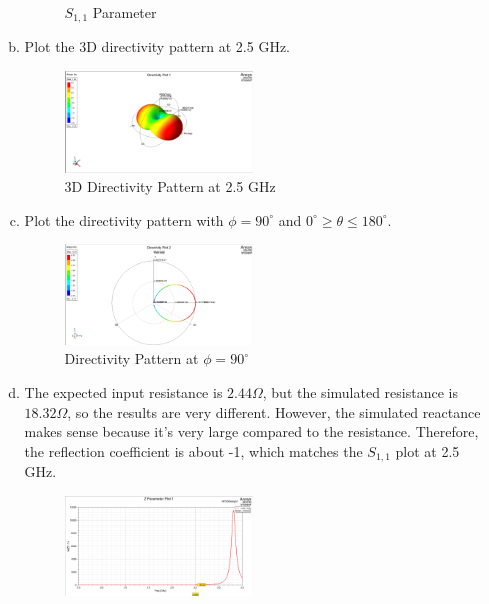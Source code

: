 \documentclass{article} %
\begin{document}
\begin{enumerate}[]
\begin{enumerate}[(a)]
\begin{figure}[H]
                        \caption{$S_{1,1}$ Parameter}
                    \end{figure}
              \item Plot the 3D directivity pattern at 2.5 GHz.
                    \begin{figure}[H]
                        \centering
                        \includegraphics[width=0.5\textwidth]{./image/figure3.png}
                        \caption{3D Directivity Pattern at 2.5 GHz}
                    \end{figure}
              \item Plot the directivity pattern with $\phi = 90 ^{\circ}$ and $0^{\circ} \geq \theta \leq 180 ^{\circ}$.
                    \begin{figure}[H]
                        \centering
                        \includegraphics[width=0.5\textwidth]{./image/figure4.png}
                        \caption{Directivity Pattern at $\phi = 90 ^{\circ}$}
                    \end{figure}
              \item The expected input resistance is $2.44 \Omega$, but the simulated resistance is $18.32 \Omega$, so the results are very different. However, the simulated reactance makes sense because it's very large compared to the resistance. Therefore, the reflection coefficient is about -1, which matches the $S_{1, 1}$ plot at 2.5 GHz.
                    \begin{figure}[H]
                        \centering
                        \includegraphics[width=0.5\textwidth]{./image/figure5.png}

\end{figure}
\end{enumerate}
\end{enumerate}
\end{document}
